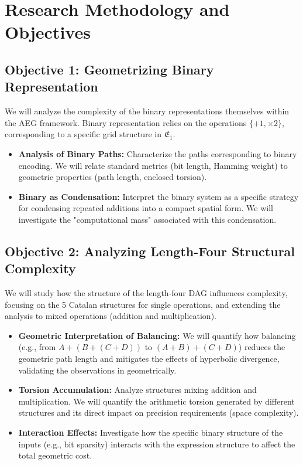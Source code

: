 \documentclass[11pt, a4paper]{article}
\begin{document}
\section{Research Methodology and Objectives}

\subsection{Objective 1: Geometrizing Binary Representation}

We will analyze the complexity of the binary representations themselves within the AEG framework. Binary representation relies on the operations $\{+1, \times 2\}$, corresponding to a specific grid structure in $\mathfrak{E}_1$.

\begin{itemize}
    \item \textbf{Analysis of Binary Paths:} Characterize the paths corresponding to binary encoding. We will relate standard metrics (bit length, Hamming weight) to geometric properties (path length, enclosed torsion).
    \item \textbf{Binary as Condensation:} Interpret the binary system as a specific strategy for condensing repeated additions into a compact spatial form. We will investigate the "computational mass" associated with this condensation.
\end{itemize}

\subsection{Objective 2: Analyzing Length-Four Structural Complexity}

We will study how the structure of the length-four DAG influences complexity, focusing on the 5 Catalan structures for single operations, and extending the analysis to mixed operations (addition and multiplication).

\begin{itemize}
    \item \textbf{Geometric Interpretation of Balancing:} We will quantify how balancing (e.g., from $A+(B+(C+D))$ to $(A+B)+(C+D)$) reduces the geometric path length and mitigates the effects of hyperbolic divergence, validating the observations in \cite{Wilhelm2017} geometrically.
    \item \textbf{Torsion Accumulation:} Analyze structures mixing addition and multiplication. We will quantify the arithmetic torsion generated by different structures and its direct impact on precision requirements (space complexity).
    \item \textbf{Interaction Effects:} Investigate how the specific binary structure of the inputs (e.g., bit sparsity) interacts with the expression structure to affect the total geometric cost.
\end{itemize}
\end{document}
